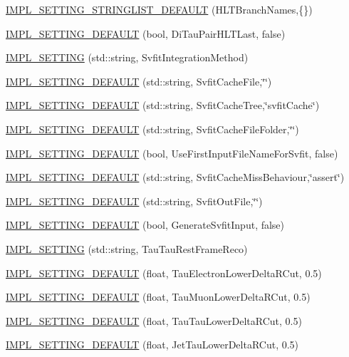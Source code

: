 \begin{DoxyCompactItemize}
\hyperlink{classHttSettings_ad6b4742eaea19aeabc3ddcf31b69606f}{IMPL\_\-SETTING\_\-STRINGLIST\_\-DEFAULT} (HLTBranchNames,\{\})
\item 
\hyperlink{classHttSettings_adac071f81d9bd3aa4c7269b9e5f12276}{IMPL\_\-SETTING\_\-DEFAULT} (bool, DiTauPairHLTLast, false)
\item 
\hyperlink{classHttSettings_a01f8ffe8b57c0e0a5ce42ddea4074b10}{IMPL\_\-SETTING} (std::string, SvfitIntegrationMethod)
\item 
\hyperlink{classHttSettings_a7fb46615968a14864b5d70d43c53f71d}{IMPL\_\-SETTING\_\-DEFAULT} (std::string, SvfitCacheFile,\char`\"{}\char`\"{})
\item 
\hyperlink{classHttSettings_a3119e8f477ab24526676874edcfed7b3}{IMPL\_\-SETTING\_\-DEFAULT} (std::string, SvfitCacheTree,\char`\"{}svfitCache\char`\"{})
\item 
\hyperlink{classHttSettings_a87ee236801590c12c57f609a1b9e0f9c}{IMPL\_\-SETTING\_\-DEFAULT} (std::string, SvfitCacheFileFolder,\char`\"{}\char`\"{})
\item 
\hyperlink{classHttSettings_a6f3eacd7b57c5cdec47fa3ad1cbb0173}{IMPL\_\-SETTING\_\-DEFAULT} (bool, UseFirstInputFileNameForSvfit, false)
\item 
\hyperlink{classHttSettings_a958ee247569fa830756d0085db2a978f}{IMPL\_\-SETTING\_\-DEFAULT} (std::string, SvfitCacheMissBehaviour,\char`\"{}assert\char`\"{})
\item 
\hyperlink{classHttSettings_a3dac9f43fcb3c7a5d70b58afda648707}{IMPL\_\-SETTING\_\-DEFAULT} (std::string, SvfitOutFile,\char`\"{}\char`\"{})
\item 
\hyperlink{classHttSettings_a6c716fd3af2c6ef4c4710befb1f56a92}{IMPL\_\-SETTING\_\-DEFAULT} (bool, GenerateSvfitInput, false)
\item 
\hyperlink{classHttSettings_abcde40e309d5a43f7e4b6842c9efe4e9}{IMPL\_\-SETTING} (std::string, TauTauRestFrameReco)
\item 
\hyperlink{classHttSettings_ac08dfb991a30202ac452541b223d4f77}{IMPL\_\-SETTING\_\-DEFAULT} (float, TauElectronLowerDeltaRCut, 0.5)
\item 
\hyperlink{classHttSettings_a1d665e4d010863f0c9115b4b1070ca17}{IMPL\_\-SETTING\_\-DEFAULT} (float, TauMuonLowerDeltaRCut, 0.5)
\item 
\hyperlink{classHttSettings_a6eae32445118b93d4b062fcc41517f2d}{IMPL\_\-SETTING\_\-DEFAULT} (float, TauTauLowerDeltaRCut, 0.5)
\item 
\hyperlink{classHttSettings_a0761009fdeef4d51d6a22430aede8fdf}{IMPL\_\-SETTING\_\-DEFAULT} (float, JetTauLowerDeltaRCut, 0.5)

\end{DoxyCompactItemize}
